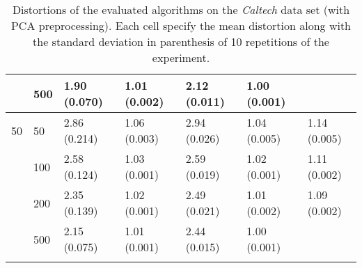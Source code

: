 \begin{longtable}{lllllll}
   & 500 &  1.90 (0.070) &   1.01 (0.002) &  2.12 (0.011) &         1.00 (0.001) &  \\
 \midrule
50 & 50  &  2.86 (0.214) &   1.06 (0.003) &  2.94 (0.026) &         1.04 (0.005) &  1.14 (0.005) \\
   & 100 &  2.58 (0.124) &   1.03 (0.001) &  2.59 (0.019) &         1.02 (0.001) &  1.11 (0.002) \\
   & 200 &  2.35 (0.139) &   1.02 (0.001) &  2.49 (0.021) &         1.01 (0.002) &  1.09 (0.002) \\
   & 500 &  2.15 (0.075) &   1.01 (0.001) &  2.44 (0.015) &         1.00 (0.001) &            \\
\bottomrule
\caption{Distortions of the evaluated algorithms on the \textit{Caltech} data set (with PCA preprocessing). Each cell specify the mean distortion along with the standard deviation in parenthesis of 10 repetitions of the experiment.}
\label{tab:distortions-mean-std-caltech-pca}
\end{longtable}

